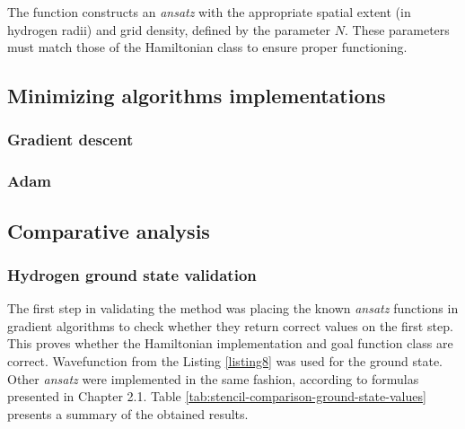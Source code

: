 The function constructs an \textit{ansatz} with the appropriate spatial extent (in hydrogen radii) and grid density, defined by the parameter $N$. These parameters must match those of the Hamiltonian class to ensure proper functioning.

\newpage

\subsection{Minimizing algorithms implementations}
\subsubsection{Gradient descent}

\vspace{0.2cm}


\subsubsection{Adam}

\vspace{0.2cm}


\subsection{Comparative analysis}

\subsubsection{Hydrogen ground state validation}

The first step in validating the method was placing the known \textit{ansatz} functions in gradient algorithms to check whether they return correct values on the first step. This proves whether the Hamiltonian implementation and goal function class are correct. Wavefunction from the Listing \ref{listing8} was used for the ground state. Other \textit{ansatz} were implemented in the same fashion, according to formulas presented in Chapter 2.1. Table \ref{tab:stencil-comparison-ground-state-values} presents a summary of the obtained results.

